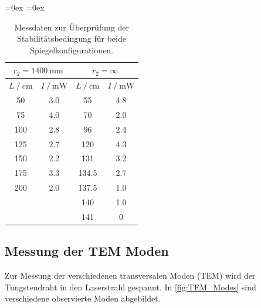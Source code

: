 \begin{table}
  \centering
  \aboverulesep=0ex %
  \belowrulesep=0ex %
  \caption{Messdaten zur Überprüfung der Stabilitätsbedingung für beide Spiegelkonfigurationen.}
  \label{tab:stability}
  \begin{tabular}{S[table-format = 3.0] S[table-format = 1.1] | S[table-format = 3.1] S[table-format = 1.1]}
     &  \\
    \midrule
    \rule{0pt}{1.1EM}
    {$L \mathbin{/} \unit{\centi\metre}$} & {$I \mathbin{/} \unit{\milli\watt}$} & {$L \mathbin{/} \unit{\centi\metre}$} & {$I \mathbin{/} \unit{\milli\watt}$}\\
    \midrule
    \rule{0pt}{1.1EM}
     50 & 3.0 &    55 & 4.8 \\
     75 & 4.0 &    70 & 2.0 \\
    100 & 2.8 &    96 & 2.4 \\
    125 & 2.7 &   120 & 4.3 \\
    150 & 2.2 &   131 & 3.2 \\
    175 & 3.3 & 134.5 & 2.7 \\
    200 & 2.0 & 137.5 & 1.0 \\
        &     &   140 & 1.0 \\
        &     &   141 &   0 \\ 
  \end{tabular}
\end{table}

\subsection{Messung der TEM Moden}

Zur Messung der verschiedenen transversalen Moden (TEM) wird der Tungstendraht in den Laserstrahl gespannt.
In \autoref{fig:TEM_Modes} sind verschiedene observierte Moden abgebildet.

